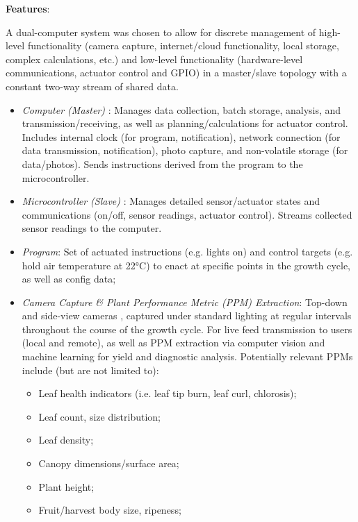 \clearpage

\textbf{Features}:

A dual-computer system was chosen to allow for discrete management of high-level functionality (camera capture, internet/cloud functionality, local storage, complex calculations, etc.) and low-level functionality (hardware-level communications, actuator control and GPIO) in a master/slave topology with a constant two-way stream of shared data.

\begin{itemize}
    \item \textit{Computer (Master)} \cite{raspberrypi}: Manages data collection, batch storage, analysis, and transmission/receiving, as well as planning/calculations for actuator control. Includes internal clock (for program, notification), network connection (for data transmission, notification), photo capture, and non-volatile storage (for data/photos). Sends instructions derived from the program to the microcontroller.
    \item \textit{Microcontroller (Slave)} \cite{arduino}: Manages detailed sensor/actuator states and communications (on/off, sensor readings, actuator control). Streams collected sensor readings to the computer.
    \item \textit{Program}: Set of actuated instructions (e.g. lights on) and control targets (e.g. hold air temperature at 22°C) to enact at specific points in the growth cycle, as well as config data;
    \item \textit{Camera Capture \& Plant Performance Metric (PPM) Extraction}: Top-down and side-view cameras \cite{camera}, captured under standard lighting at regular intervals throughout the course of the growth cycle. For live feed transmission to users (local and remote), as well as PPM extraction via computer vision and machine learning for yield and diagnostic analysis. Potentially relevant PPMs include (but are not limited to):
    \begin{itemize}
        \item Leaf health indicators (i.e. leaf tip burn, leaf curl, chlorosis);
        \item Leaf count, size distribution;
        \item Leaf density;
        \item Canopy dimensions/surface area;
        \item Plant height;
        \item Fruit/harvest body size, ripeness;
    \end{itemize}

\end{itemize}
